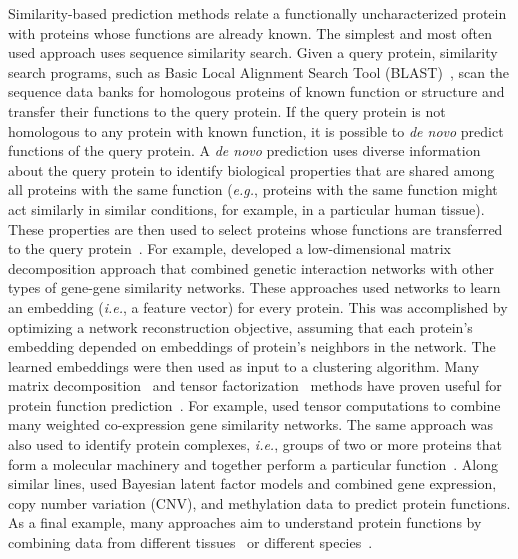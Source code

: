 \documentclass[5p]{elsarticle}
\newcommand{\eg}{\emph{e.g.}\xspace}
\newcommand{\ie}{\emph{i.e.}\xspace}
\newcommand{\rev}[1]{{\color{black}#1}}
\begin{document}
Similarity-based prediction methods relate a functionally uncharacterized protein with proteins whose functions are already known.
The simplest and most often used approach uses sequence similarity search.
Given a query protein, similarity search programs, such as Basic Local Alignment Search Tool \rev{(BLAST)~\cite{Altschul1990basic}, scan} the sequence data banks for homologous proteins of known function or structure and \rev{transfer} their functions to the query protein.
If the query protein is not homologous to any protein with known function, it is possible to {\em de novo} predict functions of the query protein.
A {\em de novo} prediction uses diverse information about the query protein to identify biological properties that are shared among all proteins with the same function (\eg, proteins with the same function might act similarly in similar conditions, for example, in a particular human tissue).
These properties are then used to select proteins whose functions are transferred to the query protein~\cite{Carreras2017comprehensive}.
For example, \cite{Zitnik2015impute,Cho2016compact} developed a low-dimensional matrix decomposition approach that combined genetic interaction networks with other types of gene-gene similarity networks.
These approaches used networks to learn an embedding (\ie, a feature vector) for every protein.
This was accomplished by optimizing a network reconstruction objective, assuming that each protein's embedding depended on embeddings of protein's neighbors in the network.
The learned embeddings were then used as input to \rev{a clustering} algorithm.
Many matrix decomposition~\cite{Zitnik2012nimfa} and tensor factorization~\cite{Nickel2011} methods have proven useful for protein function prediction~\cite{Radivojac2013large}.
For example, \cite{Li2011integrative,Ou2016two} used tensor computations to combine many weighted co-expression gene similarity networks.
The same approach was also used to identify protein complexes, \ie, groups of two or more proteins that form a molecular machinery and together perform a particular function~\cite{Bugge2016combined,Shi2015strategy}.
Along similar lines, \cite{Myers2005discovery,Ray2014bayesian,Greene2015understanding} used Bayesian latent factor models and combined gene expression, copy number variation (CNV), and methylation data to predict protein functions.
As a final example, many approaches aim to understand protein functions by combining data from different tissues~\cite{Greene2015understanding,Ori2015integrated,Zitnik2017ohmnet,Andrews2017cross} or different species~\cite{Deng2010investigating,Hooghe2012flexible,Setty2012inferring,Penfold2015inferring,Imam2015integrated,Ihekwaba2016integrative}.
\end{document}
